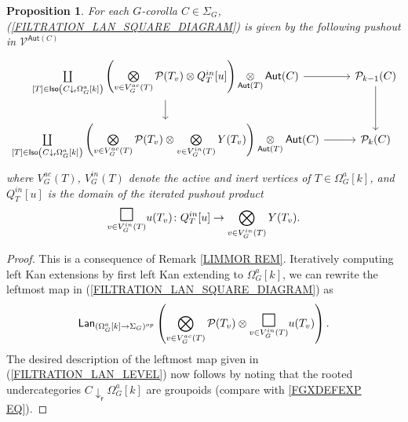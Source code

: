 \documentclass[a4paper,10pt
,draft
]{article}%
\numberwithin{equation}{section}
\numberwithin{figure}{section}
\newtheorem{proposition}[equation]{Proposition}%
\theoremstyle{definition} %
\newcommand{\V}{\ensuremath{\mathcal V}}
\renewcommand{\P}{\ensuremath{\mathcal P}}
\newcommand{\1}{\ensuremath{\mathbbm 1}}%
\begin{document}
\begin{proposition}
For each $G$-corolla $C \in \Sigma_G$,
(\ref{FILTRATION_LAN_SQUARE_DIAGRAM})
is given by the following pushout in $\V^{\mathsf{Aut}(C)}$
\begin{equation}\label{FILTRATION_LAN_LEVEL}
\begin{tikzcd}
	\coprod\limits_{[T] \in \mathsf{Iso}
		\left(C \downarrow_{\mathsf{r}} \Omega_G^a[k]\right)}
	\left(
		\bigotimes\limits_{v \in V_{G}^{ac}(T)}\P(T_v) \otimes
		Q_T^{in}[u]
	\right)
		\mathop{\otimes}\limits_{\mathsf{Aut}(T)} \mathsf{Aut}(C)
	\arrow[r] \arrow[d] &
	\P_{k-1}(C) \arrow[d] 
\\
	\coprod\limits_{[T] \in \mathsf{Iso}
		\left(C \downarrow_{\mathsf{r}} \Omega_G^a[k]\right)}
	\left(
		\bigotimes\limits_{v \in V_{G}^{ac}(T)}\P(T_v) \otimes
		\bigotimes\limits_{v \in V_{G}^{in}(T)} Y(T_v)
	\right)
		\underset{\mathsf{Aut}(T)}{\otimes} \mathsf{Aut}(C)
	\arrow[r] &
	\P_k(C)
\end{tikzcd}
\end{equation}
where $ V_{G}^{ac}(T)$, $V_{G}^{in}(T)$ denote the active and inert vertices of $T \in \Omega_G^a[k]$,
and $Q_T^{in}[u]$ is the domain 
of the iterated pushout product
\[
		\underset{v \in V_G^{in}(T)}
		{\mathlarger{\mathlarger{\mathlarger{\square}}}}u(T_v)
	\colon
		Q_T^{in}[u] \to
		\bigotimes\limits_{v \in V_{G}^{in}(T)} Y(T_v).
\]
\end{proposition}


\begin{proof}
This is a consequence of Remark \ref{LIMMOR REM}.
Iteratively computing left Kan extensions by first left Kan extending to $\Omega_G^a[k]$, we can rewrite the leftmost map in 
(\ref{FILTRATION_LAN_SQUARE_DIAGRAM}) as
\begin{equation}\label{FILTINTALT EQ}
	\mathsf{Lan}_{(\Omega_G^a[k] \to \Sigma_G)^{op}}
	\left(
		\bigotimes\limits_{v \in V_{G}^{ac}(T)}\P(T_v) \otimes
		\underset{v \in V_{G}^{in}(T)}
		{\mathlarger{\mathlarger{\mathlarger{\square}}}}
		u(T_v)
	\right).
\end{equation}
The desired description of the leftmost map given in (\ref{FILTRATION_LAN_LEVEL})
now follows by noting that the rooted undercategories
$C \downarrow_{\mathsf{r}} \Omega_G^a[k]$
are groupoids (compare with \eqref{FGXDEFEXP EQ}).
\end{proof}
\end{document}
